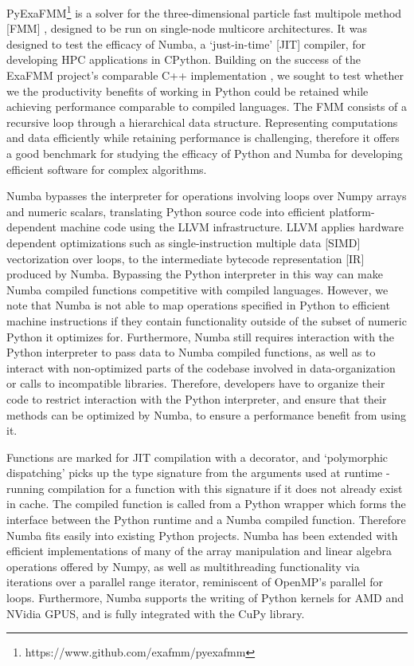 \documentclass{IEEEcsmag}
\begin{document}
PyExaFMM\footnote{https://www.github.com/exafmm/pyexafmm} is a solver for the three-dimensional particle fast multipole method [FMM] \cite{Greengard1987}, designed to be run on single-node multicore architectures. It was designed to test the efficacy of Numba, a `just-in-time' [JIT] compiler, for developing HPC applications in CPython. Building on the success of the ExaFMM project's comparable C++ implementation \cite{Wang2021}, we sought to test whether we the productivity benefits of working in Python could be retained while achieving performance comparable to compiled languages.  The FMM consists of a recursive loop through a hierarchical data structure. Representing computations and data efficiently while retaining performance is challenging, therefore it offers a good benchmark for studying the efficacy of Python and Numba for developing efficient software for complex algorithms.

Numba bypasses the interpreter for operations involving loops over Numpy arrays and numeric scalars, translating Python source code into efficient platform-dependent machine code using the LLVM infrastructure. LLVM applies hardware dependent optimizations such as single-instruction multiple data [SIMD] vectorization over loops, to the intermediate bytecode representation [IR] produced by Numba. Bypassing the Python interpreter in this way can make Numba compiled functions competitive with compiled languages. However, we note that Numba is not able to map operations specified in Python to efficient machine instructions if they contain functionality outside of the subset of numeric Python it optimizes for. Furthermore, Numba still requires interaction with the Python interpreter to pass data to Numba compiled functions, as well as to interact with non-optimized parts of the codebase involved in data-organization or calls to incompatible libraries. Therefore, developers have to organize their code to restrict interaction with the Python interpreter, and ensure that their methods can be optimized by Numba, to ensure a performance benefit from using it.

Functions are marked for JIT compilation with a decorator, and `polymorphic dispatching' picks up the type signature from the arguments used at runtime - running compilation for a function with this signature if it does not already exist in cache. The compiled function is called from a Python wrapper which forms the interface between the Python runtime and a Numba compiled function. Therefore Numba fits easily into existing Python projects. Numba has been extended with efficient implementations of many of the array manipulation and linear algebra operations offered by Numpy, as well as multithreading functionality via iterations over a parallel range iterator, reminiscent of OpenMP's parallel for loops. Furthermore, Numba supports the writing of Python kernels for AMD and NVidia GPUS, and is fully integrated with the CuPy library.
\end{document}
